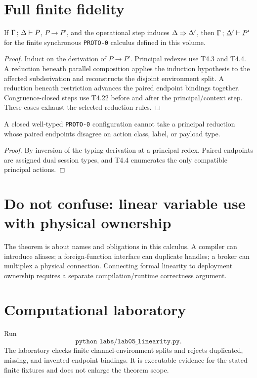 \section{Full finite fidelity}
\begin{theorem}
If $\Gamma\,;\,\Delta \vdash P$, $P\to P'$, and the operational step induces $\Delta\Rightarrow\Delta'$, then $\Gamma\,;\,\Delta' \vdash P'$ for the finite synchronous \texttt{PROTO-0} calculus defined in this volume.
\end{theorem}
\begin{proof}
Induct on the derivation of $P\to P'$. Principal redexes use T4.3 and T4.4. A reduction beneath parallel composition applies the induction hypothesis to the affected subderivation and reconstructs the disjoint environment split. A reduction beneath restriction advances the paired endpoint bindings together. Congruence-closed steps use T4.22 before and after the principal/context step. These cases exhaust the selected reduction rules.
\end{proof}
\begin{corollary}
A closed well-typed \texttt{PROTO-0} configuration cannot take a principal reduction whose paired endpoints disagree on action class, label, or payload type.
\end{corollary}
\begin{proof}
By inversion of the typing derivation at a principal redex. Paired endpoints are assigned dual session types, and T4.4 enumerates the only compatible principal actions.
\end{proof}

\section{Do not confuse: linear variable use with physical ownership}
\begin{warningbox}
The theorem is about names and obligations in this calculus. A compiler can introduce aliases; a foreign-function interface can duplicate handles; a broker can multiplex a physical connection. Connecting formal linearity to deployment ownership requires a separate compilation/runtime correctness argument.
\end{warningbox}



\section{Computational laboratory}
\begin{labbox}
Run
\[
  \texttt{python labs/lab05_linearity.py}.
\]
The laboratory checks finite channel-environment splits and rejects duplicated, missing, and invented endpoint bindings. It is executable evidence for the stated finite fixtures and does not enlarge the theorem scope.
\end{labbox}

